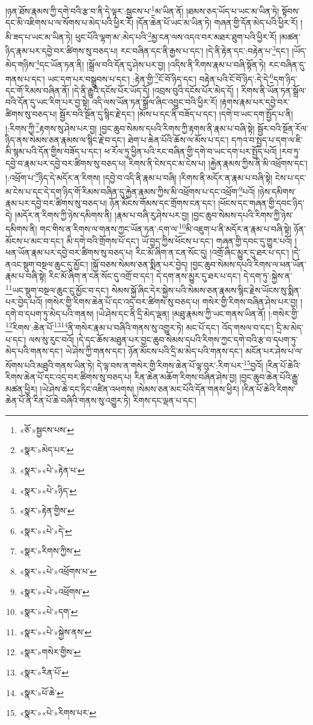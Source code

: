 །ཉན་ཐོས་རྣམས་ཀྱི་དགེ་བའི་རྩ་བ་ནི་དེ་ལྟར་:སྦྱངས་པ་\footnote{«ཅོ་»སྦྱངས་པས་}མ་ཡིན་ནོ། །ཐམས་ཅད་ཡོད་པ་ཡང་མ་ཡིན་ཏེ། སྟོབས་དང་མི་འཇིགས་པ་ལ་སོགས་པ་མེད་པའི་ཕྱིར་རོ། །དོན་ཆེན་པོ་ཡང་མ་ཡིན་ཏེ། གཞན་གྱི་དོན་མེད་པའི་ཕྱིར་རོ། །མི་ཟད་པ་ཡང་མ་ཡིན་ཏེ། ཕུང་པོའི་ལྷག་མ་:མེད་པའི་\footnote{«སྣར་»མེད་པར་}མྱ་ངན་ལས་འདའ་བར་མཐར་ཐུག་པའི་ཕྱིར་རོ། །མཚན་ཉིད་རྣམ་པར་དབྱེ་བར་ཚིགས་སུ་བཅད་པ། རང་བཞིན་དང་ནི་རྒྱས་པ་དང་། །དེ་ནི་རྟེན་དང་:བརྟེན་པ་\footnote{«སྣར་»«པེ་»རྟེན་པ་}དང་། །ཡོད་མེད་གཉིས་\footnote{«སྣར་»«པེ་»ཉིད་}དང་ཡོན་ཏན་ནི། །སྒྲོལ་བའི་དོན་དུ་ཤེས་པར་བྱ། །འདིས་ནི་རིགས་རྣམ་པ་བཞི་སྟོན་ཏེ། རང་བཞིན་དུ་གནས་པ་དང་། ཡང་དག་པར་བསྒྲུབས་པ་དང་། :རྟེན་གྱི་\footnote{«སྣར་»རྟེན་གྱིས་}ངོ་བོ་ཉིད་དང་། བརྟེན་པའི་ངོ་བོ་ཉིད་:དེ་དེ་\footnote{«སྣར་»«པེ་»དེ་}དག་ཉིད་དང་གོ་རིམས་བཞིན་ནོ། །དེ་ནི་རྒྱུའི་དངོས་པོར་ཡོད་དོ། །འབྲས་བུའི་དངོས་པོར་མེད་དོ། །
རིགས་ནི་ཡོན་ཏན་སྒྲོལ་བའི་དོན་དུ་ཡང་རིག་པར་བྱ་སྟེ། འདི་ལས་ཡོན་ཏན་སྒྲོལ་ཞིང་འབྱུང་བའི་ཕྱིར་རོ། །རྟགས་རྣམ་པར་དབྱེ་བར་ཚིགས་སུ་བཅད་པ། སྦྱོར་བའི་སྔོན་དུ་སྙིང་རྗེ་དང་། །མོས་པ་དང་ནི་བཟོད་པ་དང་། །དགེ་བ་ཡང་དག་སྤྱོད་པ་ནི། །:རིགས་ཀྱི་\footnote{«སྣར་»རིགས་ཀྱིས་}རྟགས་སུ་ཤེས་པར་བྱ། །བྱང་ཆུབ་སེམས་དཔའི་རིགས་ཀྱི་རྟགས་ནི་རྣམ་པ་བཞི་སྟེ། སྦྱོར་བའི་སྔོན་རོལ་ཉིད་ནས་སེམས་ཅན་རྣམས་ལ་སྙིང་རྗེ་བ་དང་། ཐེག་པ་ཆེན་པོའི་ཆོས་ལ་མོས་པ་དང་། དཀའ་བ་སྤྱད་པ་དག་ལ་ཇི་མི་སྙམ་པའི་དོན་གྱིས་བཟོད་པ་དང་། ཕ་རོལ་ཏུ་ཕྱིན་པའི་རང་བཞིན་གྱི་དགེ་བ་ཡང་དག་པར་སྤྱོད་པའོ། །རབ་ཏུ་དབྱེ་བ་རྣམ་པར་དབྱེ་བར་ཚིགས་སུ་བཅད་པ། རིགས་ནི་ངེས་དང་མ་ངེས་པ། །རྐྱེན་རྣམས་ཀྱིས་ནི་མི་འཕྲོགས་དང་། །:འཕྲོག་པ་\footnote{«སྣར་»«པེ་»འཕྲོགས་པ་}ཉིད་དེ་མདོར་ན་རིགས། །དབྱེ་བ་འདི་ནི་རྣམ་པ་བཞི། །རིགས་ནི་མདོར་ན་རྣམ་པ་བཞི་སྟེ། ངེས་པ་དང་མ་ངེས་པ་དང་དེ་དག་ཉིད་གོ་རིམས་བཞིན་དུ་རྐྱེན་རྣམས་ཀྱིས་མི་འཕྲོགས་པ་དང་འཕྲོག་\footnote{«སྣར་»«པེ་»འཕྲོགས་}པའོ། །ཉེས་དམིགས་རྣམ་པར་དབྱེ་བར་ཚིགས་སུ་བཅད་པ། ཉོན་མོངས་གོམས་དང་གྲོགས་ངན་དང་། །ཕོངས་དང་གཞན་གྱི་དབང་ཉིད་དེ། །མདོར་ན་རིགས་ཀྱི་ཉེས་དམིགས་ནི། །རྣམ་པ་བཞི་རུ་ཤེས་པར་བྱ། །བྱང་ཆུབ་སེམས་དཔའི་རིགས་ཀྱི་ཉེས་དམིགས་ནི། གང་གིས་ན་རིགས་ལ་གནས་ཀྱང་ཡོན་ཏན་:དག་ལ་\footnote{«སྣར་»«པེ་»དག་}མི་འཇུག་པ་ནི་མདོར་ན་རྣམ་པ་བཞི་སྟེ། ཉོན་མོངས་པ་མང་བ་དང་། མི་དགེ་བའི་གྲོགས་པོ་དང་། ཡོ་བྱད་ཀྱིས་ཕོངས་པ་དང་། གཞན་གྱི་དབང་དུ་གྱུར་པའོ། །ཕན་ཡོན་རྣམ་པར་དབྱེ་བར་ཚིགས་སུ་བཅད་པ། རིང་མོ་ཞིག་ན་ངན་སོང་དུ། །འགྲོ་ཞིང་མྱུར་དུ་ཐར་པ་དང་། །དེ་ནའང་སྡུག་བསྔལ་ཆུང་དུ་མྱོང་། །སྐྱོ་བཅས་སེམས་ཅན་སྨིན་པར་བྱེད། །བྱང་ཆུབ་སེམས་དཔའི་རིགས་ལ་ཕན་ཡོན་རྣམ་པ་བཞི་སྟེ། རིང་མོ་ཞིག་ན་ངན་སོང་དུ་འགྲོ་བ་དང་། དེ་དག་ནས་མྱུར་དུ་ཐར་པ་དང་། དེ་དག་ཏུ་:སྐྱེས་ན་\footnote{«སྣར་»«པེ་»སྐྱེས་ནས་}ཡང་སྡུག་བསྔལ་ཆུང་ངུ་མྱོང་བ་དང་། སེམས་སྐྱོ་ཞིང་དེར་སྐྱེས་པའི་སེམས་ཅན་རྣམས་སྙིང་རྗེས་ཡོངས་སུ་སྨིན་པར་བྱེད་པའོ། །གསེར་གྱི་རིགས་ཆེན་པོ་དང་འདྲ་བར་ཚིགས་སུ་བཅད་པ། གསེར་གྱི་རིགས་བཞིན་ཤེས་པར་བྱ། །དགེ་བ་དཔག་ཏུ་མེད་པའི་གནས། །ཡེ་ཤེས་དང་ནི་དྲི་མེད་ལྡན། །མཐུ་རྣམས་ཀྱི་ཡང་གནས་ཡིན་ནོ། །:གསེར་གྱི་\footnote{«སྣར་»གསེར་གྱིས་}རིགས་:ཆེན་པོ་\footnote{«སྣར་»རིན་པོ་}\footnote{«སྣར་»པོ་ཆེ་}ནི་གསེར་རྣམ་པ་བཞིའི་གནས་སུ་འགྱུར་ཏེ། མང་པོ་དང་། འོད་གསལ་བ་དང་། དྲི་མ་མེད་པ་དང་། ལས་སུ་རུང་བའོ། །དེ་དང་ཆོས་མཐུན་པར་བྱང་ཆུབ་སེམས་དཔའི་རིགས་ཀྱང་དགེ་བའི་རྩ་བ་དཔག་ཏུ་མེད་པའི་གནས་དང་། ཡེ་ཤེས་ཀྱི་གནས་དང་། ཉོན་མོངས་པའི་དྲི་མ་མེད་པའི་གནས་དང་། མངོན་པར་ཤེས་པ་ལ་སོགས་པའི་མཐུའི་གནས་ཡིན་ཏེ། དེ་ལྟ་བས་ན་གསེར་གྱི་རིགས་ཆེན་པོ་ལྟ་བུར་:རིག་པར་\footnote{«སྣར་»«པེ་»རིགས་པར་}བྱའོ། །རིན་པོ་ཆེའི་རིགས་ཆེན་པོ་དང་འདྲ་བར་ཚིགས་སུ་བཅད་པ། རིན་ཆེན་མཆོག་རིགས་བཞིན་ཤེས་བྱ། །བྱང་ཆུབ་ཆེན་པོའི་རྒྱུ་མཚན་ཕྱིར། །ཡེ་ཤེས་ཆེ་དང་ཏིང་འཛིན་འཕགས། །སེམས་ཅན་མང་པོའི་དོན་གནས་ཕྱིར། །རིན་པོ་ཆེའི་རིགས་ཆེན་པོ་ནི་རིན་པོ་ཆེ་བཞིའི་གནས་སུ་འགྱུར་ཏེ། རིགས་དང་ལྡན་པ་དང་། 